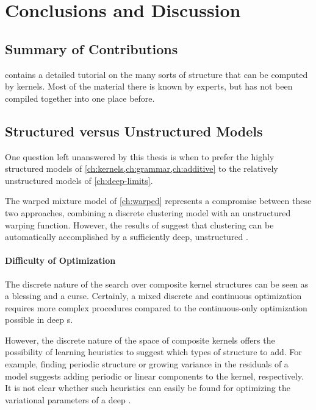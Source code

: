 
\inbpdocument

\chapter{Conclusions and Discussion}
\label{ch:discussion}


\section{Summary of Contributions}

 contains a detailed tutorial on the many sorts of structure that can be computed by kernels.
Most of the material there is known by experts, but has not been compiled together into one place before.

\section{Structured versus Unstructured \sgp{} Models}

One question left unanswered by this thesis is when to prefer the highly structured models of \cref{ch:kernels,ch:grammar,ch:additive} to the relatively unstructured models of \cref{ch:deep-limits}.

The warped mixture model of \cref{ch:warped} represents a compromise between these two approaches, combining a discrete clustering model with an unstructured warping function.
However, the results of \citep{damianou2012deep} suggest that clustering can be automatically accomplished by a sufficiently deep, unstructured \gp{}.

\subsubsection{Difficulty of Optimization}
The discrete nature of the search over composite kernel structures can be seen as a blessing and a curse.
Certainly, a mixed discrete and continuous optimization requires more complex procedures compared to the continuous-only optimization possible in deep \gp{}s.

However, the discrete nature of the space of composite kernels offers the possibility of learning heuristics to suggest which types of structure to add.
For example, finding periodic structure or growing variance in the residuals of a model suggests adding periodic or linear components to the kernel, respectively.
It is not clear whether such heuristics can easily be found for optimizing the variational parameters of a deep \gp{}.

